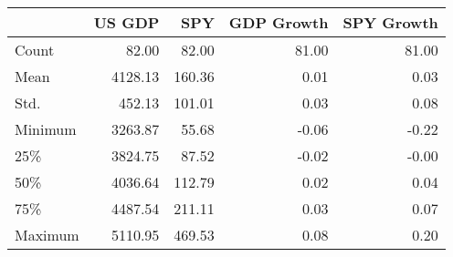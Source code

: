 
\begin{tabular}{lrrrr}
\toprule
{} &   US GDP &  SPY  &  GDP Growth &  SPY Growth \\
\midrule
Count &    82.00 &    82.00 &       81.00 &       81.00 \\
Mean  &  4128.13 &   160.36 &        0.01 &        0.03 \\
Std.   &   452.13 &   101.01 &        0.03 &        0.08 \\
Minimum   &  3263.87 &    55.68 &       -0.06 &       -0.22 \\
25\%   &  3824.75 &    87.52 &       -0.02 &       -0.00 \\
50\%   &  4036.64 &   112.79 &        0.02 &        0.04 \\
75\%   &  4487.54 &   211.11 &        0.03 &        0.07 \\
Maximum   &  5110.95 &   469.53 &        0.08 &        0.20 \\
\bottomrule
\end{tabular}

